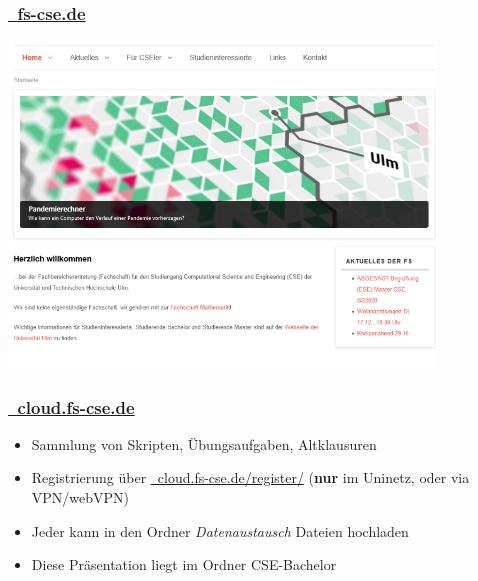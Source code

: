 \documentclass[10pt,a4paper]{beamer}
\begin{document}
    \begin{frame}
        \frametitle{ \href{http://fs-cse.de}{\Mundus~fs-cse.de}}
        \begin{center}
            \includegraphics[width=0.85\textwidth]{website.png}
        \end{center}
    \end{frame}
    \begin{frame}
        \frametitle{\href{http://cloud.fs-cse.de}{\Mundus~cloud.fs-cse.de} }
        \begin{itemize}
            \setlength{\itemsep}{10pt} %
            \item Sammlung von Skripten, Übungsaufgaben, Altklausuren
            \item Registrierung über \href{http://cloud.fs-cse.de/register/}{\Mundus~cloud.fs-cse.de/register/} (\textbf{nur} im Uninetz, oder via VPN/webVPN)
            \item Jeder kann in den Ordner \emph{Datenaustausch} Dateien hochladen
            \item Diese Präsentation liegt im Ordner CSE-Bachelor
        \end{itemize}
    \end{frame}
\end{document}
